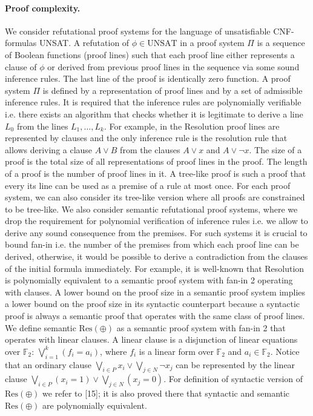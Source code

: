 \paragraph{Proof complexity.} We consider refutational proof systems for the language of unsatisfiable CNF-formulas UNSAT. A refutation of $\phi\in\mathrm{UNSAT}$ in a proof system $\Pi$ is a sequence of Boolean functions (proof lines) such that each proof line either represents a clause of $\phi$ or derived from previous proof lines in the sequence via some sound inference rules. The last line of the proof is identically zero function. A proof system $\Pi$ is defined by a representation of proof lines and by a set of admissible inference rules. It is required that the inference rules are polynomially verifiable i.e. there exists an algorithm that checks whether it is legitimate to derive a line $L_0$ from the lines $L_1,\ldots,L_k$.
For example, in the Resolution proof lines are represented by clauses and the only inference rule is the resolution rule that allows deriving a clause $A\vee B$ from the clauses $A\vee x$ and $A\vee\neg x$.
The size of a proof is the total size of all representations of proof lines in the proof. The length of a proof is the number of proof lines in it.
A tree-like proof is such a proof that every its line can be used as a premise of a rule at most once. For each proof system, we can also consider its tree-like version where all proofs are constrained to be tree-like.
We also consider semantic refutational proof systems, where we drop the requirement for polynomial verification of inference rules i.e. we allow to derive any sound consequence from the premises. For such systems it is crucial to bound fan-in i.e. the number of the premises from which each proof line can be derived, otherwise, it would be possible to derive a contradiction from the clauses of the initial formula immediately. For example, it is well-known that Resolution is polynomially equivalent to a semantic proof system with fan-in 2 operating with clauses.
A lower bound on the proof size in a semantic proof system implies a lower bound on the proof size in its syntactic counterpart because a syntactic proof is always a semantic proof that operates with the same class of proof lines.
We define semantic $\mathrm{Res}(\oplus)$ as a semantic proof system with fan-in 2 that operates with linear clauses. A linear clause is a disjunction of linear equations over $\mathbb F_2$: $\bigvee_{i=1}^k(f_i=a_i)$, where $f_i$ is a linear form over $\mathbb F_2$ and $a_i\in\mathbb F_2$. Notice that an ordinary clause $\bigvee_{i\in P}x_i\vee\bigvee_{j\in N}\neg x_j$ can be represented by the linear clause $\bigvee_{i\in P}(x_i=1)\vee\bigvee_{j\in N}(x_j=0)$. For definition of syntactic version of $\mathrm{Res}(\oplus)$ we refer to [15]; it is also proved there that syntactic and semantic $\mathrm{Res}(\oplus)$ are polynomially equivalent.
